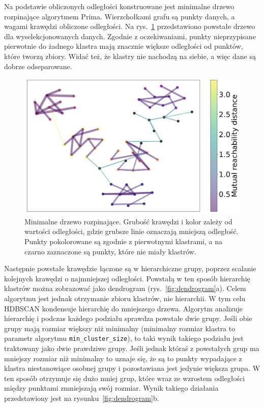 	Na podstawie obliczonych odległości konstruowane jest minimalne drzewo rozpinające algorytmem Prima.
	Wierzchołkami grafu są punkty danych, a wagami krawędzi obliczone odległości.
	Na rys.~\ref{fig:mst} przedstawiono powstałe drzewo dla wyselekcjonowanych danych.
	Zgodnie z oczekiwaniami, punkty nieprzypisane pierwotnie do żadnego klastra mają znacznie większe odległości od punktów, które tworzą zbiory.
	Widać też, że klastry nie nachodzą na siebie, a więc dane są dobrze odseparowane.
	
	\begin{figure}[htb]
		\centering
		\includegraphics[width=0.5\linewidth]{rys04/hdbscan_mst.png}
		\caption[Minimalne drzewo rozpinające]{Minimalne drzewo rozpinające. Grubość krawędzi i kolor zależy od wartości odległości, gdzie grubsze linie oznaczają mniejszą odległość.
			Punkty pokolorowane są zgodnie z pierwotnymi klastrami, a na czarno zaznaczone są punkty, które nie miały klastrów.}\label{fig:mst}
	\end{figure}
	
	Następnie powstałe krawędzie łączone są w hierarchiczne grupy, poprzez scalanie kolejnych krawędzi o najmniejszej odległości.
	Powstałą w ten sposób hierarchię klastrów można zobrazować jako dendrogram (rys.~\ref{fig:dendrogram}a).
	Celem algorytmu jest jednak otrzymanie zbioru klastrów, nie hierarchii.
	W tym celu HDBSCAN kondensuje hierarchię do mniejszego drzewa.
	Algorytm analizuje hierarchię i podczas każdego podziału sprawdza powstałe dwie grupy.
	Jeśli obie grupy mają rozmiar większy niż minimalny (minimalny rozmiar klastra to parametr algorytmu \verb|min_cluster_size|),
		to taki wynik takiego podziału jest traktowany jako dwie prawdziwe grupy.
	Jeśli jednak któraś z powstałych grup ma mniejszy rozmiar niż minimalny to uznaje się,
		że są to punkty wypadające z klastra niestanowiące osobnej grupy i pozostawiana jest jedynie większa grupa.
	W ten sposób otrzymuje się dużo mniej grup, które wraz ze wzrostem odległości między punktami zmniejszają swój rozmiar.
	Wynik takiego działania przedstawiony jest na rysunku~\ref{fig:dendrogram}b.
	
